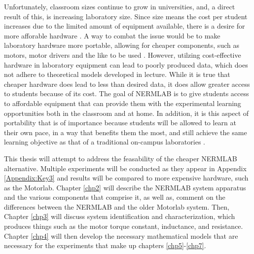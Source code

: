 Unfortunately, classroom sizes continue to grow in universities, and, a direct result of this, is increasing laboratory size. Since size means the cost per student increases due to the limited amount of equipment available, there is a desire for more afforable hardware \citep{4}. A way to combat the issue would be to make laboratory hardware more portable, allowing for cheaper components, such as motors, motor drivers and the like to be used \citep{Experimential_Learning}. However, utilzing cost-effective hardware in laboratory equipment can lead to poorly produced data, which does not adhere to theoretical models developed in lecture. While it is true that cheaper hardware does lead to less than desired data, it does allow greater access to students because of its cost. The goal of NERMLAB is to give students access to affordable equipment that can provide them with the experimental learning opportunities both in the classroom and at home. In addition, it is this aspect of portability that is of importance because students will be allowed to learn at their own pace, in a way that benefits them the most, and still achieve the same learning objective as that of a traditional on-campus laboratories \citep{Experimential_Learning}.

This thesis will attempt to address the feasability of the cheaper NERMLAB alternative. Multiple experiments will be conducted as they appear in Appendix \ref{Appendix:Key3} and results will be compared to more expensive hardware, such as the Motorlab. Chapter \ref{chp2} will describe the NERMLAB system apparatus and the various components that comprise it, as well as, comment on the differences between the NERMLAB and the older Motorlab system. Then, Chapter \ref{chp3} will discuss system identification and characterization, which produces things such as the motor torque constant, inductance, and resistance. Chapter \ref{chp4} will then develop the necessary mathematical models that are necessary for the experiments that make up chapters \ref{chp5}-\ref{chp7}. 